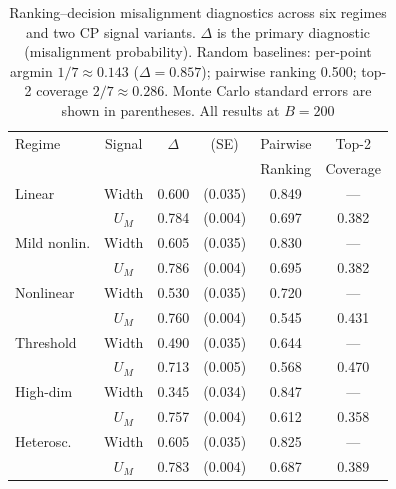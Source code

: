 \documentclass[pdflatex,sn-mathphys-ay]{sn-jnl}%
\theoremstyle{thmstyleone}%
\theoremstyle{thmstyletwo}%
\theoremstyle{thmstylethree}%
\begin{document}
\begin{table}[t]
    \centering
    \caption{Ranking--decision misalignment diagnostics across six regimes and two CP signal variants. $\Delta$ is the primary diagnostic (misalignment probability). Random baselines: per-point argmin $1/7 \approx 0.143$ ($\Delta = 0.857$); pairwise ranking 0.500; top-2 coverage $2/7 \approx 0.286$. Monte Carlo standard errors are shown in parentheses. All results at $B=200$}
    \label{tab:misalignment}
    \begin{tabular}{lccccc}
        \toprule
        Regime & Signal & $\Delta$ & (SE) & Pairwise & Top-2 \\
               &        &          &      & Ranking & Coverage \\
        \midrule
        Linear & Width  & 0.600 & (0.035) & 0.849 & --- \\
               & $U_M$  & 0.784 & (0.004) & 0.697 & 0.382 \\
        \addlinespace
        Mild nonlin. & Width  & 0.605 & (0.035) & 0.830 & --- \\
               & $U_M$  & 0.786 & (0.004) & 0.695 & 0.382 \\
        \addlinespace
        Nonlinear & Width  & 0.530 & (0.035) & 0.720 & --- \\
               & $U_M$  & 0.760 & (0.004) & 0.545 & 0.431 \\
        \addlinespace
        Threshold & Width  & 0.490 & (0.035) & 0.644 & --- \\
               & $U_M$  & 0.713 & (0.005) & 0.568 & 0.470 \\
        \addlinespace
        High-dim & Width  & 0.345 & (0.034) & 0.847 & --- \\
               & $U_M$  & 0.757 & (0.004) & 0.612 & 0.358 \\
        \addlinespace
        Heterosc. & Width  & 0.605 & (0.035) & 0.825 & --- \\
               & $U_M$  & 0.783 & (0.004) & 0.687 & 0.389 \\
        \bottomrule
    \end{tabular}
\end{table}
\end{document}
